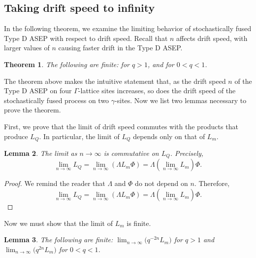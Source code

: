 \documentclass[pdftex]{sigma}
\numberwithin{equation}{section}
\newtheorem{Theorem}{Theorem}[section]
\newtheorem{Lemma}[Theorem]{Lemma}
\theoremstyle{definition}
\begin{document}
\subsection{Taking drift speed to infinity}

In the following theorem, we examine the limiting behavior of stochastically fused Type D ASEP with respect to drift speed. Recall that $n$ affects drift speed, with larger values of $n$ causing faster drift in the Type D ASEP.

\begin{Theorem}\label{finiteLimitTheorem}
The following are finite:  for $q > 1$, and  for $0 < q < 1$.
\end{Theorem}

The theorem above makes the intuitive statement that, as the drift speed $n$ of the Type D ASEP on four $\Gamma$-lattice sites increases, so does the drift speed of the stochastically fused process on two $\gamma$-sites. Now we list two lemmas necessary to prove the theorem.

First, we prove that the limit of drift speed commutes with the products that produce $L_Q$. In particular, the limit of $L_Q$ depends only on that of $L_m$.

\begin{Lemma}
\label{commutativityProposition}
The limit as $n \to \infty$ is commutative on $L_Q$. Precisely, \[\lim_{n \to \infty} L_Q = \lim_{n \to \infty} (\Lambda L_m \Phi) = \Lambda (\lim_{n \to \infty} L_m) \Phi.\]
\end{Lemma}

\begin{proof} \label{commutativity_proof}
We remind the reader that $\Lambda$ and $\Phi$ do not depend on $n$. Therefore,
\[\lim_{n \to \infty} L_Q = \lim_{n \to \infty} (\Lambda L_m \Phi) = \Lambda (\lim_{n \to \infty} L_m) \Phi.\tag*{\qed}
\]\renewcommand{\qed}{}
\end{proof}

Now we must show that the limit of $L_m$ is finite.

\begin{Lemma}
\label{finiteProposition}
The following are finite: $\lim_{n \to \infty} \bigl(q^{-2n} L_m\bigr)$ for $q >1$ and $\lim_{n \to \infty} \bigl(q^{2n} L_m\bigr)$ for $0 < q < 1$.
\end{Lemma}
\end{document}
